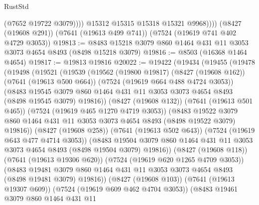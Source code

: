 \begin{lexlean}{RustStd}
\begin{coremodule}
                  (@7652 @19722 @3079))))
            @15312
            @15315
            @15318
            @15321
            @9968))))
    (@8427 (@19608 @291))
    (@7641 (@19613 @499 @741))
    (@7524 (@19619 @741 @402 @4729 @3053))
@19813 := @8483 @15218 @3079 @860 @1464 @431 @11 @3053 @3073 @4654 @8493 (@8498 @15218 @3079)
@19816 := @8503 (@16368 @1464 @4654)
@19817 := @19813 @19816
@20022 := @19422
    (@19434
      (@19455
        (@19478
          (@19498
            (@19521
              (@19539
                (@19562
                  (@19800 @19817)
                  (@8427 (@19608 @162))
                  (@7641 (@19613 @500 @664))
                  (@7524 (@19619 @664 @488 @4724 @3053))
                  (@8483
                    @19545
                    @3079
                    @860
                    @1464
                    @431
                    @11
                    @3053
                    @3073
                    @4654
                    @8493
                    (@8498 @19545 @3079)
                    @19816))
                (@8427 (@19608 @132))
                (@7641 (@19613 @501 @465))
                (@7524 (@19619 @465 @1270 @4719 @3053))
                (@8483
                  @19522
                  @3079
                  @860
                  @1464
                  @431
                  @11
                  @3053
                  @3073
                  @4654
                  @8493
                  (@8498 @19522 @3079)
                  @19816))
              (@8427 (@19608 @258))
              (@7641 (@19613 @502 @643))
              (@7524 (@19619 @643 @477 @4714 @3053))
              (@8483
                @19504
                @3079
                @860
                @1464
                @431
                @11
                @3053
                @3073
                @4654
                @8493
                (@8498 @19504 @3079)
                @19816))
            (@8427 (@19608 @118))
            (@7641 (@19613 @19306 @620))
            (@7524 (@19619 @620 @1265 @4709 @3053))
            (@8483
              @19481
              @3079
              @860
              @1464
              @431
              @11
              @3053
              @3073
              @4654
              @8493
              (@8498 @19481 @3079)
              @19816))
          (@8427 (@19608 @103))
          (@7641 (@19613 @19307 @609))
          (@7524 (@19619 @609 @462 @4704 @3053))
          (@8483
            @19461
            @3079
            @860
            @1464
            @431
            @11

\end{coremodule}
\end{lexlean}

